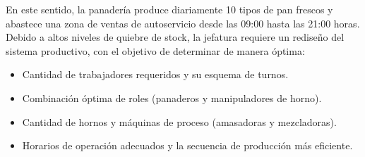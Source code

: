 \documentclass[11pt,letterpaper]{article}
\begin{document}
En este sentido, la panadería produce diariamente 10 tipos de pan frescos y abastece una zona de ventas de autoservicio desde las 09:00 hasta las 21:00 horas. Debido a altos niveles de quiebre de stock, la jefatura requiere un rediseño del sistema productivo, con el objetivo de determinar de manera óptima:
\begin{itemize}
    \item Cantidad de trabajadores requeridos y su esquema de turnos.
    \item Combinación óptima de roles (panaderos y manipuladores de horno).
    \item Cantidad de hornos y máquinas de proceso (amasadoras y mezcladoras).
    \item Horarios de operación adecuados y la secuencia de producción más eficiente.
\end{itemize}
\end{document}
